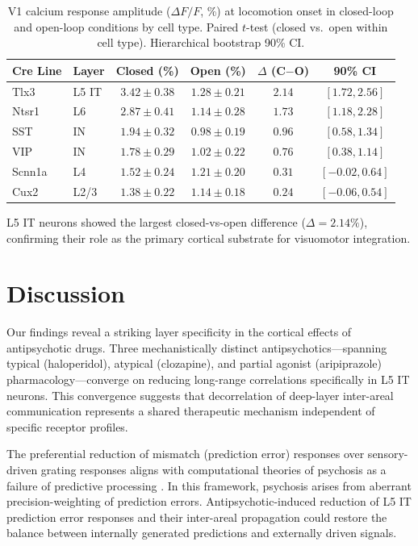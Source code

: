 \documentclass[11pt]{article}
\begin{document}
\begin{table}[H]
\centering
\caption{V1 calcium response amplitude ($\Delta F/F$, \%) at locomotion onset in closed-loop and open-loop conditions by cell type. Paired $t$-test (closed vs.\ open within cell type). Hierarchical bootstrap 90\% CI.}
\label{tab:motor}
\begin{tabular}{llcccc}
\toprule
\textbf{Cre Line} & \textbf{Layer} & \textbf{Closed (\%)} & \textbf{Open (\%)} & \textbf{$\Delta$ (C$-$O)} & \textbf{90\% CI} \\
\midrule
Tlx3 & L5 IT & $3.42 \pm 0.38$ & $1.28 \pm 0.21$ & $\mathbf{2.14}$ & $[1.72, 2.56]$ \\
Ntsr1 & L6 & $2.87 \pm 0.41$ & $1.14 \pm 0.28$ & $1.73$ & $[1.18, 2.28]$ \\
SST & IN & $1.94 \pm 0.32$ & $0.98 \pm 0.19$ & $0.96$ & $[0.58, 1.34]$ \\
VIP & IN & $1.78 \pm 0.29$ & $1.02 \pm 0.22$ & $0.76$ & $[0.38, 1.14]$ \\
Scnn1a & L4 & $1.52 \pm 0.24$ & $1.21 \pm 0.20$ & $0.31$ & $[-0.02, 0.64]$ \\
Cux2 & L2/3 & $1.38 \pm 0.22$ & $1.14 \pm 0.18$ & $0.24$ & $[-0.06, 0.54]$ \\
\bottomrule
\end{tabular}
\end{table}

L5 IT neurons showed the largest closed-vs-open difference ($\Delta = 2.14\%$), confirming their role as the primary cortical substrate for visuomotor integration.

\section{Discussion}

Our findings reveal a striking layer specificity in the cortical effects of antipsychotic drugs. Three mechanistically distinct antipsychotics---spanning typical (haloperidol), atypical (clozapine), and partial agonist (aripiprazole) pharmacology---converge on reducing long-range correlations specifically in L5 IT neurons. This convergence suggests that decorrelation of deep-layer inter-areal communication represents a shared therapeutic mechanism independent of specific receptor profiles.

The preferential reduction of mismatch (prediction error) responses over sensory-driven grating responses aligns with computational theories of psychosis as a failure of predictive processing \citep{friston2005theory, adams2013computational}. In this framework, psychosis arises from aberrant precision-weighting of prediction errors. Antipsychotic-induced reduction of L5 IT prediction error responses and their inter-areal propagation could restore the balance between internally generated predictions and externally driven signals.
\end{document}
